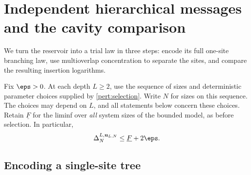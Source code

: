 \section{Independent hierarchical messages and the cavity comparison}
\label{comp:section}

We turn the reservoir into a trial law in three steps: encode its full
one-site branching law, use multioverlap concentration to separate the
sites, and compare the resulting insertion logarithms.

Fix $\eps>0$. At each depth $L\ge2$, use the sequence of sizes and
deterministic parameter choices supplied by \cref{pert:selection}.
Write $N$ for sizes on this sequence. The choices may depend on $L$, and all statements below concern
these choices. Retain $\underline F$ for the liminf over \emph{all} system
sizes of the bounded model, as before selection. In particular,
\begin{equation}\label{comp:low-increments}
 \Delta_N^{L,\mathbf u_{L,N}}\le\underline F+2\eps.
\end{equation}

\subsection{Encoding a single-site tree}


